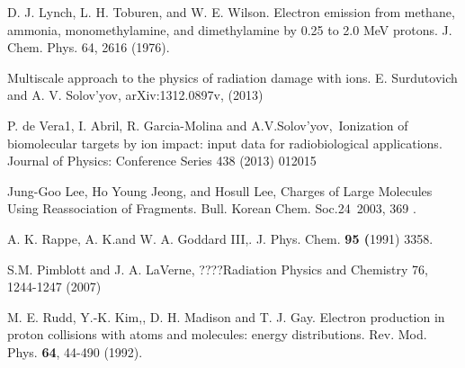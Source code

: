 \documentclass[preprint,showpacs,pra]{revtex4}
\begin{document}
\begin{thebibliography}{99}
 D. J. Lynch, L. H. Toburen, and W. E. Wilson. Electron
emission from methane, ammonia, monomethylamine, and dimethylamine by 0.25
to 2.0 MeV protons. J. Chem. Phys. 64, 2616 (1976).

 Multiscale approach to the physics of radiation
damage with ions. E. Surdutovich and A. V. Solov'yov, arXiv:1312.0897v,
(2013)

 P. de Vera1, I. Abril, R. Garcia-Molina and
A.V.Solov'yov,\ Ionization of biomolecular targets by ion impact: input data
for radiobiological applications. Journal of Physics: Conference Series 438
(2013) 012015

 Jung-Goo Lee, Ho Young Jeong, and Hosull Lee, Charges of
Large Molecules Using Reassociation of Fragments. Bull. Korean Chem. Soc.24\
2003, 369 .

 A. K. Rappe, A. K.and W. A. Goddard III,. J. Phys. Chem. 
\textbf{95 (}1991) 3358.

 S.M. Pimblott and J. A. LaVerne, ????Radiation
Physics and Chemistry 76, 1244-1247 (2007)

 M. E. Rudd, Y.-K. Kim,, D. H. Madison and T. J. Gay.
Electron production in proton collisions with atoms and molecules: energy
distributions. Rev. Mod. Phys. \textbf{64}, 44-490 (1992).
\end{thebibliography}
\end{document}
